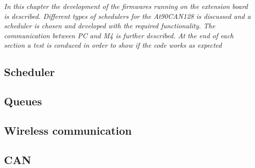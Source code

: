 \textit{In this chapter the development of the firmwares running on the extension board is described. Different types of schedulers for the At90CAN128 is discussed and a scheduler is chosen and developed with the required functionality. The communication between PC and M4 is further described. At the end of each section a test is conduced in order to show if the code works as expected }
\subsection{Scheduler}

\newpage

\subsection{Queues}

\newpage
%

\subsection{Wireless communication}


\newpage
\subsection{CAN}

\newpage
